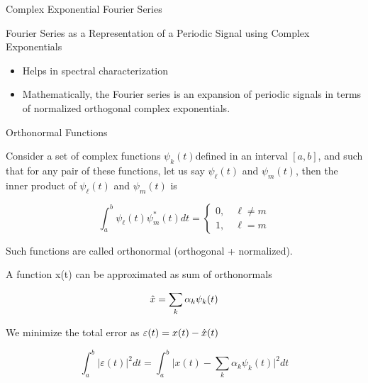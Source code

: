 \documentclass[aspectratio=169,xcolor=dvipsnames,svgnames,x11names,fleqn]{beamer}
\begin{document}

\begin{frame}{}
    \begin{center}
    \Huge \bf \color{DarkBlue}
    \faCoffee
    
   Complex Exponential Fourier Series


\end{center}
\end{frame}

\begin{frame}{\small Fourier Series as a Representation of a Periodic Signal using Complex Exponentials}

\begin{itemize}
    \item Helps in spectral characterization
\item Mathematically, the Fourier series is an expansion of periodic signals in terms of normalized orthogonal complex exponentials.

\end{itemize}
    
\end{frame}

\begin{frame}{Orthonormal Functions}

    Consider a set of complex functions ${\psi_k(t)} $defined in an interval $[a,b]$, and such that for any pair of these functions, let us say $\psi_\ell(t)$ and $\psi_m(t)$,
then the inner product of $\psi_\ell(t)$ and $\psi_m(t)$ is 

$$
\int_a^b \psi_\ell(t)\psi_m^*(t) dt = \begin{cases}
    0 , \quad \ell \neq m\\
    1, \quad \ell = m 
\end{cases}
$$

\begin{center}
    Such functions are called orthonormal (orthogonal + normalized).
\end{center}

\end{frame}

\begin{frame}{A function x(t) can be approximated as sum of orthonormals}

    $$
{\hat x} = \sum_k \alpha_k \psi_k (t)    
    $$

    We minimize the total error as $\varepsilon(t) = x(t) - {\hat x}(t)$

    $$
    \int_a^b |\varepsilon(t)|^2 dt = \int_a^b \bigg | x(t)  - \sum_k \alpha_k \psi_k (t)  \bigg|^2 dt
    $$
\end{frame}
\end{document}
